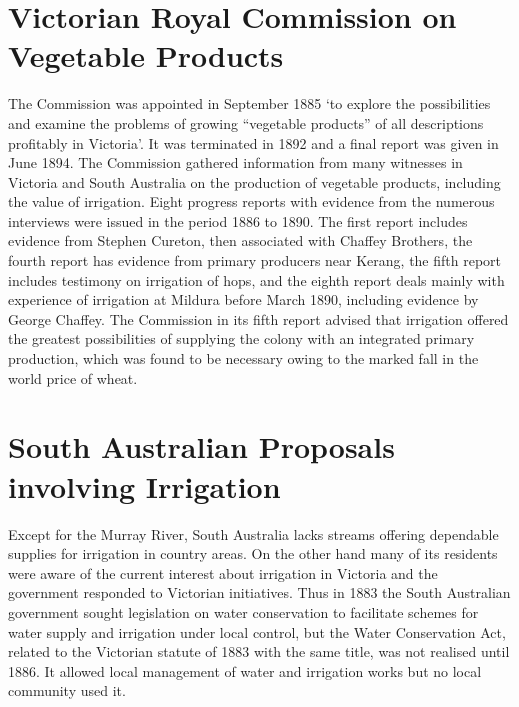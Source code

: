 \section*{Victorian Royal Commission on Vegetable Products}

The Commission was appointed in September 1885 `to explore the
possibilities and examine the problems of growing ``vegetable
products'' of all descriptions profitably in Victoria'.  It was
terminated in 1892 and a final report was given in June 1894.  The
Commission gathered information from many witnesses in Victoria and
South Australia on the production of vegetable products, including the
value of irrigation.  Eight progress reports with evidence from the
numerous interviews were issued in the period 1886 to 1890.  The first
report includes evidence from Stephen Cureton, then associated with
Chaffey Brothers, the fourth report has evidence from primary
producers near Kerang, the fifth report includes testimony on
irrigation of hops, and the eighth report deals mainly with experience
of irrigation at Mildura before March 1890, including evidence by
George Chaffey.  The Commission in its fifth report advised that
irrigation offered the greatest possibilities of supplying the colony
with an integrated primary production, which was found to be necessary
owing to the marked fall in the world price of wheat.

\section*{South Australian Proposals involving Irrigation}

Except for the Murray River, South Australia lacks streams offering
dependable supplies for irrigation in country areas.  On the other
hand many of its residents were aware of the current interest about
irrigation in Victoria and the government responded to Victorian
initiatives.  Thus in 1883 the South Australian government sought
legislation on water conservation to facilitate schemes for water
supply and irrigation under local control, but the Water Conservation
Act, related to the Victorian statute of 1883 with the same title, was
not realised until 1886.  It allowed local management of water and
irrigation works but no local community used
it.

